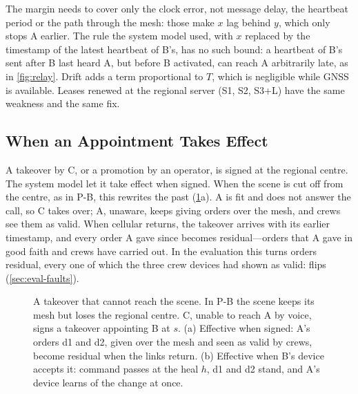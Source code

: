 The margin needs to cover only the clock error, not message delay, the heartbeat period or
the path through the mesh: those make $x$ lag behind $y$, which only stops A earlier. The
rule the system model used, with $x$ replaced by the timestamp of the latest heartbeat of
B's, has no such bound: a heartbeat of B's sent after B last heard A, but before B
activated, can reach A arbitrarily late, as in \cref{fig:relay}. Drift adds a term
proportional to $T$, which is negligible while GNSS is available. Leases renewed at the
regional server (S1, S2, S3+L) have the same weakness and the same fix.

\subsection{When an Appointment Takes Effect}
\label{sec:acceptance}

A takeover by C, or a promotion by an operator, is signed at the regional centre. The
system model let it take effect when signed. When the scene is cut off from the centre, as
in P-B, this rewrites the past (\cref{fig:acceptance}a). A is fit and does not answer the
call, so C takes over; A, unaware, keeps giving orders over the mesh, and crews see them as
valid. When cellular returns, the takeover arrives with its earlier timestamp, and every
order A gave since becomes residual---orders that A gave in good faith and crews have
carried out. In the evaluation this turns \tbSignedResidual{} orders residual, every one of
which the three crew devices had shown as valid: \tbSignedFlips{} flips
(\cref{sec:eval-faults}).

\begin{figure}[t]
\centering

\caption{A takeover that cannot reach the scene. In P-B the scene keeps its mesh but loses
the regional centre. C, unable to reach A by voice, signs a takeover appointing B at $s$.
(a) Effective when signed: A's orders d1 and d2, given over the mesh and seen as valid by
crews, become residual when the links return. (b) Effective when B's device accepts it:
command passes at the heal $h$, d1 and d2 stand, and A's device learns of the change at
once.}
\label{fig:acceptance}
\end{figure}

